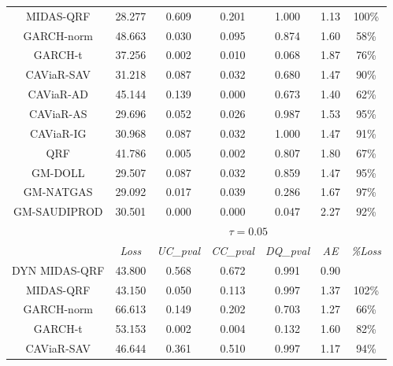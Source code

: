 \begin{table}[H]
\begin{tabular}{ccccccc}
\rowcolor[HTML]{D9D9D9} 
MIDAS-QRF                           & 28.277 & 0.609    & 0.201    & 1.000    & 1.13 & 100\%  \\
\rowcolor[HTML]{D9D9D9} GARCH-norm                    & 48.663 & 0.030    & 0.095    & 0.874    & 1.60 & 58\%   \\
GARCH-t                       & 37.256 & 0.002    & 0.010    & 0.068    & 1.87 & 76\%   \\
\rowcolor[HTML]{D9D9D9} 
CAViaR-SAV                    & 31.218 & 0.087    & 0.032    & 0.680    & 1.47 & 90\%   \\
CAViaR-AD                     & 45.144 & 0.139    & 0.000    & 0.673    & 1.40 & 62\%   \\
\rowcolor[HTML]{D9D9D9} CAViaR-AS                     & 29.696 & 0.052    & 0.026    & 0.987    & 1.53 & 95\%   \\
\rowcolor[HTML]{D9D9D9} 
CAViaR-IG                     & 30.968 & 0.087    & 0.032    & 1.000    & 1.47 & 91\%   \\
QRF                           & 41.786 & 0.005    & 0.002    & 0.807    & 1.80 & 67\%   \\
GM-DOLL                       & 29.507 & 0.087    & 0.032    & 0.859    & 1.47 & 95\%   \\
GM-NATGAS                     & 29.092 & 0.017    & 0.039    & 0.286    & 1.67 & 97\%   \\
GM-SAUDIPROD                 & 30.501 & 0.000    & 0.000    & 0.047    & 2.27 & 92\%   \\ \hline
                              & \multicolumn{6}{c}{$\tau=0.05$}                         \\ \hline
                              & \textit{Loss}   & \textit{UC\_pval} & \textit{CC\_pval} & \textit{DQ\_pval }& \textit{AE }  & \textit{\%Loss}\\ \hline
\rowcolor[HTML]{D9D9D9} 
DYN MIDAS-QRF                       & 43.800 & 0.568    & 0.672    & 0.991    & 0.90 &        \\
\rowcolor[HTML]{D9D9D9} 
MIDAS-QRF                           & 43.150 & 0.050    & 0.113    & 0.997    & 1.37 & 102\%  \\
\rowcolor[HTML]{D9D9D9} 
GARCH-norm                    & 66.613 & 0.149    & 0.202    & 0.703    & 1.27 & 66\%   \\
GARCH-t                       & 53.153 & 0.002    & 0.004    & 0.132    & 1.60 & 82\%   \\
\rowcolor[HTML]{D9D9D9} 
CAViaR-SAV                    & 46.644 & 0.361    & 0.510    & 0.997    & 1.17 & 94\%   \\

\end{tabular}
\end{table}
